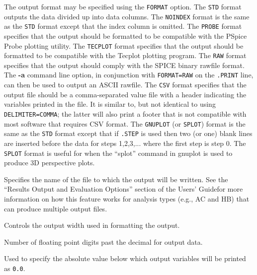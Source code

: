 \begin{Command}
\begin{Arguments}
The output format may be specified using the \texttt{FORMAT} option.
The \texttt{STD} format outputs the data divided up into data columns.
The \texttt{NOINDEX} format is the same as the \texttt{STD} format
except that the index column is omitted. The \texttt{PROBE} format
specifies that the output should be formatted to be compatible with the
 PSpice Probe plotting utility.  The
\texttt{TECPLOT} format specifies that the output should be formatted to
be compatible with the Tecplot plotting program.  The \texttt{RAW}
format specifies that the output should comply with the SPICE binary
rawfile format.  The {\bf -a} command line option, in conjunction with
\texttt{FORMAT=RAW} on the \texttt{.PRINT} line, can then be used to output an
ASCII rawfile.  The \texttt{CSV} format specifies that the output file
should be a comma-separated value file with a header indicating the
variables printed in the file.  It is similar to, but not identical to
using \texttt{DELIMITER=COMMA}; the latter will also print a footer that
is not compatible with most software that requires CSV format.  The \texttt{GNUPLOT}
(or \texttt{SPLOT}) format is the same as the \texttt{STD} format except
that if \texttt{.STEP} is used then two (or one) blank lines are inserted
before the data for steps 1,2,3,... where the first step is step 0. The
\texttt{SPLOT} format is useful for when the ``splot'' command in gnuplot
is used to produce 3D perspective plots.


Specifies the name of the file to which the output will be written.
See the ``Results Output and Evaluation Options'' section of the 
\Xyce{} Users' Guide\UsersGuide for more information on how this
feature works for analysis types (e.g., AC and HB) that can produce 
multiple output files. 


Controls the output width used in formatting the output.


Number of floating point digits past the decimal for output data.


Used to specify the absolute value below which output variables will be
printed as \texttt{0.0}.



\end{Arguments}
\end{Command}
